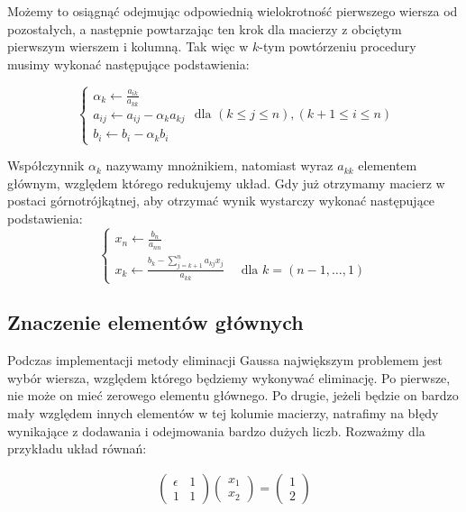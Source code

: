 \documentclass[11pt,wide]{mwart}
\begin{document}
Możemy to osiągnąć odejmując odpowiednią wielokrotność pierwszego wiersza od pozostałych, a następnie powtarzając ten krok dla macierzy z obciętym pierwszym wierszem i kolumną. Tak więc w $ k $-tym powtórzeniu procedury musimy wykonać następujące podstawienia:

\begin{equation}
\begin{cases}
	\alpha_k \leftarrow \frac{a_{ik}}{a_{kk}} \\
	a_{ij} \leftarrow a_{ij} - \alpha_k a_{kj} \\
	b_{i} \leftarrow b_{i} - \alpha_k b_{i}
\end{cases} \text{ dla }(k \leq j \leq n), (k + 1 \leq i \leq n)
\end{equation}

Współczynnik $ \alpha_k $ nazywamy mnożnikiem, natomiast wyraz $ a_{kk} $ elementem głównym, względem którego redukujemy układ. Gdy już otrzymamy macierz w postaci górnotrójkątnej, aby otrzymać wynik wystarczy wykonać następujące podstawienia:
$$ 
\begin{cases}
	x_n \leftarrow \frac{b_n}{a_{nn}} \\
	x_k \leftarrow \frac{b_k - \sum_{j = k+1}^{n} a_{kj}x_{j}}{a_{kk}} \quad \text{ dla } k = (n-1, \ldots ,  1)
\end{cases}
$$

\subsection{Znaczenie elementów głównych}

Podczas implementacji metody eliminacji Gaussa największym problemem jest wybór wiersza, względem którego będziemy wykonywać eliminację. Po pierwsze, nie może on mieć zerowego elementu głównego. Po drugie, jeżeli będzie on bardzo mały względem innych elementów w tej kolumie macierzy, natrafimy na błędy wynikające z dodawania i odejmowania bardzo dużych liczb. Rozważmy dla przykładu układ równań:

\begin{align} \label{eq:gaussfail}
\left(\begin{matrix}
\epsilon & 1	\\
       1 & 1
\end{matrix}\right)
\left(\begin{matrix}
x_1 \\ x_2
\end{matrix}\right) = 
\left(\begin{matrix}
1 \\ 2
\end{matrix}\right)
\end{align}
\end{document}
